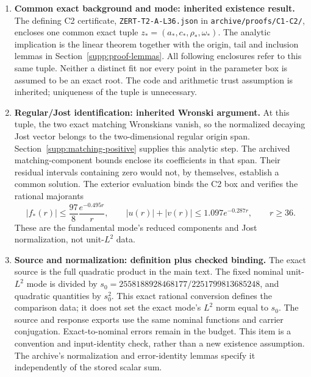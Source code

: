 \begin{enumerate}
\item\textbf{Common exact background and mode: inherited existence result.}
The defining C2 certificate, \texttt{ZERT-T2-A-L36.json} in
\texttt{archive/proofs/C1-C2/}, encloses one common exact tuple
$z_*=(a_*,c_*,\rho_*,\omega_*)$. The analytic implication is the
linear theorem together with the origin, tail and inclusion lemmas in
Section~\ref{supp:proof-lemmas}. All following enclosures refer to this
same tuple. Neither a distinct fit nor every point in the parameter box
is assumed to be an exact root. The code and arithmetic trust assumption
is inherited; uniqueness of the tuple is unnecessary.

\item\textbf{Regular/Jost identification: inherited Wronski argument.}
At this tuple, the two exact matching Wronskians vanish, so the
normalized decaying Jost vector belongs to the two-dimensional regular
origin span. Section~\ref{supp:matching-positive} supplies this analytic
step. The archived matching-component bounds enclose its coefficients
in that span. Their residual intervals containing zero would not, by
themselves, establish a common solution. The exterior evaluation binds
the C2 box and verifies the rational majorants
\begin{equation}
 |f_*(r)|\leq\frac{97}{8}\frac{e^{-0.495r}}{r},\qquad
 |u(r)|+|v(r)|\leq1.097e^{-0.287r},\qquad r\geq36.
 \label{supp:exact-tails}
\end{equation}
These are the fundamental mode's reduced components and Jost
normalization, not unit-$L^2$ data.

\item\textbf{Source and normalization: definition plus checked binding.}
The exact source is the full quadratic product in the main text.
The fixed nominal unit-$L^2$ mode is divided by
$s_0=2558188928468177/2251799813685248$, and quadratic quantities by
$s_0^2$. This exact rational conversion defines the comparison data;
it does not set the exact mode's $L^2$ norm equal to $s_0$.
The source and response exports use the same nominal functions and
carrier conjugation. Exact-to-nominal errors remain in the budget.
This item is a convention and input-identity check, rather than a
new existence assumption. The archive's normalization and error-identity
lemmas specify it independently of the stored scalar sum.


\end{enumerate}
